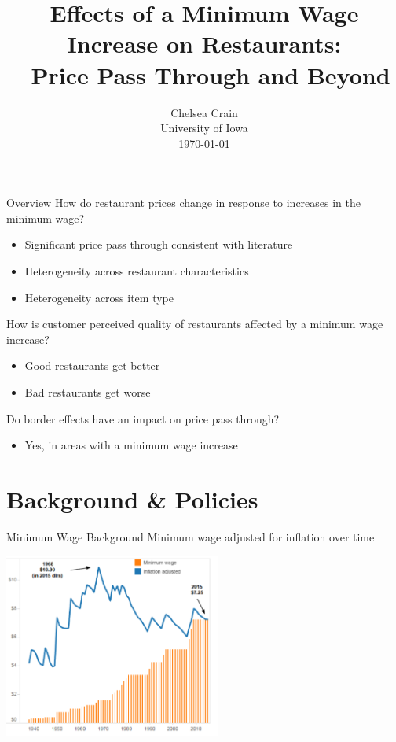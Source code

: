 \documentclass[xcolor=table]{beamer}
\title[Effects of a Minimum Wage Increase on Restaurants] %
{\large Effects of a Minimum Wage Increase on Restaurants: \\\
 Price Pass Through and Beyond}
\author[Chelsea Crain] %
{}
\institute[] %
\date %
{Chelsea Crain\\
University of Iowa\\
\today \\

}
\begin{document}
\begin{spacing}{1.2}
\begin{frame}
  \titlepage
\end{frame}



\begin{frame}{Overview}
 How do restaurant prices change in response to increases in the minimum wage?
\begin{itemize}
\item Significant price pass through consistent with literature
\item Heterogeneity across restaurant characteristics
\item Heterogeneity across item type
\end{itemize}
 How is customer perceived quality of restaurants affected by a minimum wage increase?
\begin{itemize}
\item Good restaurants get better
\item Bad restaurants get worse
\end{itemize}
 Do border effects have an impact on price pass through?
\begin{itemize}
\item Yes, in areas with a minimum wage increase
\end{itemize}
\end{frame}

\section{Background \& Policies}

\begin{frame}{Minimum Wage Background}
Minimum wage adjusted for inflation over time

\bigskip 

\centering
\includegraphics[width=2.8in]{cnbc_graph.png}


\end{frame}
\end{spacing}
\end{document}
